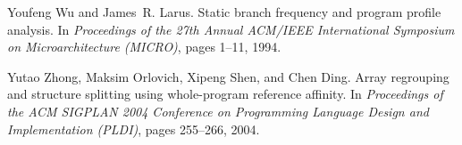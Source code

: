 \documentclass{article}
\begin{document}
\begin{small}
Youfeng Wu and James~R. Larus.
\newblock Static branch frequency and program profile analysis.
\newblock In \emph{Proceedings of the 27th Annual ACM/IEEE International Symposium on Microarchitecture (MICRO)}, pages 1--11, 1994.

Yutao Zhong, Maksim Orlovich, Xipeng Shen, and Chen Ding.
\newblock Array regrouping and structure splitting using whole-program reference affinity.
\newblock In \emph{Proceedings of the ACM SIGPLAN 2004 Conference on Programming Language Design and Implementation (PLDI)}, pages 255--266, 2004.

\end{small}
\end{document}
